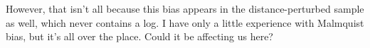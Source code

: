 \documentclass[usenatbib]{mn2e}
\begin{document}
However, that isn't all because this bias appears in the distance-perturbed sample as well, which never contains a log. I have only a little experience with Malmquist bias, but it's all over the place. Could it be affecting us here?




\end{document}

